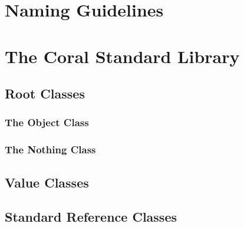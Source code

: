 \chapter{Naming Guidelines}

\chapter{The Coral Standard Library}

\section{Root Classes}

\subsection{The Object Class}

\subsection{The Nothing Class}

\section{Value Classes}

\section{Standard Reference Classes}



















